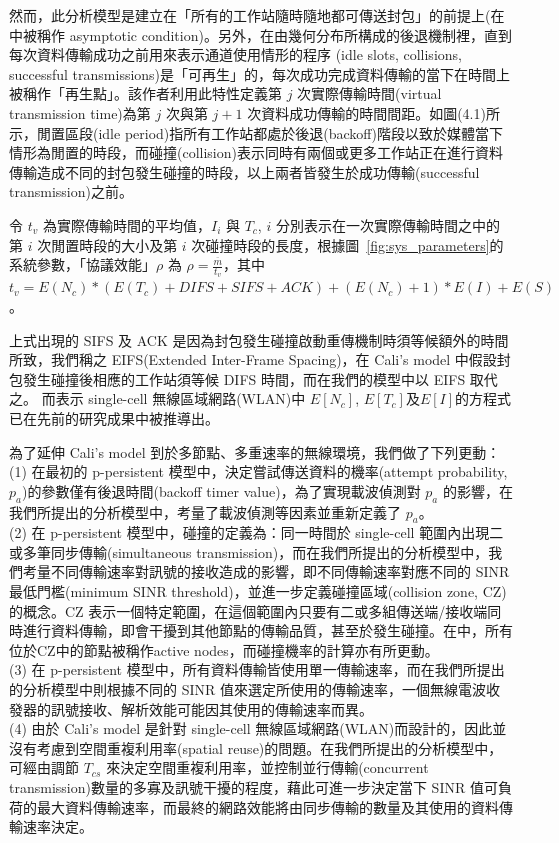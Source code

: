 \documentclass[12pt,a4paper]{article}
\newcommand{\Fig}[1]{圖~\ref{#1}}
\begin{document}
\begin{description}
\begin{enumerate}
然而，此分析模型是建立在「所有的工作站隨時隨地都可傳送封包」的前提上(在\cite{tn00_cali}中被稱作 asymptotic condition)。另外，在由幾何分布所構成的後退機制裡，直到每次資料傳輸成功之前用來表示通道使用情形的程序 (idle slots, collisions, successful transmissions)是「可再生」的，每次成功完成資料傳輸的當下在時間上被稱作「再生點」。該作者利用此特性定義第 $j$ 次實際傳輸時間(virtual transmission time)為第 $j$ 次與第 $j+1$ 次資料成功傳輸的時間間距。如圖(4.1)所示，閒置區段(idle period)指所有工作站都處於後退(backoff)階段以致於媒體當下情形為閒置的時段，而碰撞(collision)表示同時有兩個或更多工作站正在進行資料傳輸造成不同的封包發生碰撞的時段，以上兩者皆發生於成功傳輸(successful transmission)之前。 

令 $t_v$ 為實際傳輸時間的平均值，$I_i$ 與 $T_c$, $i$ 分別表示在一次實際傳輸時間之中的第 $i$ 次閒置時段的大小及第 $i$ 次碰撞時段的長度，根據\Fig{fig:sys_parameters}的系統參數，「協議效能」$\rho$ 為 $\rho = \frac{ \overline{m} }{t_v} $，其中 $t_v = E(N_c)*(E(T_c)+DIFS+SIFS+ACK) + (E(N_c)+1)*E(I) + E(S)$。

上式出現的 SIFS 及 ACK 是因為封包發生碰撞啟動重傳機制時須等候額外的時間所致，我們稱之 EIFS(Extended Inter-Frame Spacing)，在 Cali's model 中假設封包發生碰撞後相應的工作站須等候 DIFS 時間，而在我們的模型中以 EIFS 取代之。 
而表示 single-cell 無線區域網路(WLAN)中 $E[N_c]$, $E[T_c]$及$E[I]$的方程式已在先前的研究成果中\cite{tn00_cali}被推導出。

為了延伸 Cali's model 到於多節點、多重速率的無線環境，我們做了下列更動： 
(1) 在最初的 p-persistent 模型中，決定嘗試傳送資料的機率(attempt probability, $p_a$)的參數僅有後退時間(backoff timer value)，為了實現載波偵測對 $p_a$ 的影響，在我們所提出的分析模型中，考量了載波偵測等因素並重新定義了 $p_a$。 \\
(2) 在 p-persistent 模型中，碰撞的定義為：同一時間於 single-cell 範圍內出現二或多筆同步傳輸(simultaneous transmission)，而在我們所提出的分析模型中，我們考量不同傳輸速率對訊號的接收造成的影響，即不同傳輸速率對應不同的 SINR 最低門檻(minimum SINR threshold)，並進一步定義碰撞區域(collision zone, CZ)的概念。CZ 表示一個特定範圍，在這個範圍內只要有二或多組傳送端/接收端同時進行資料傳輸，即會干擾到其他節點的傳輸品質，甚至於發生碰撞。在\cite{tn00_cali}中，所有位於CZ中的節點被稱作active nodes，而碰撞機率的計算亦有所更動。 \\
(3) 在 p-persistent 模型中，所有資料傳輸皆使用單一傳輸速率，而在我們所提出的分析模型中則根據不同的 SINR 值來選定所使用的傳輸速率，一個無線電波收發器的訊號接收、解析效能可能因其使用的傳輸速率而異。 \\
(4) 由於 Cali’s model 是針對 single-cell 無線區域網路(WLAN)而設計的，因此並沒有考慮到空間重複利用率(spatial reuse)的問題。在我們所提出的分析模型中，可經由調節 $T_{cs}$ 來決定空間重複利用率，並控制並行傳輸(concurrent transmission)數量的多寡及訊號干擾的程度，藉此可進一步決定當下 SINR 值可負荷的最大資料傳輸速率，而最終的網路效能將由同步傳輸的數量及其使用的資料傳輸速率決定。 


\end{enumerate}
\end{description}
\end{document}
